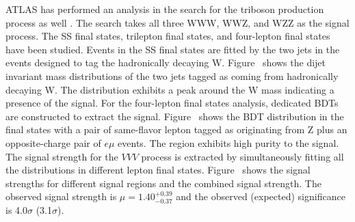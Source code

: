 ATLAS has performed an analysis in the search for the triboson production process as well \cite{Aad:2019udh}.
The search takes all three WWW, WWZ, and WZZ as the signal process.
The SS final states, trilepton final states, and four-lepton final states have been studied.
Events in the SS final states are fitted by the two jets in the events designed to tag the hadronically decaying W.
Figure~ shows the dijet invariant mass distributions of the two jets tagged as coming from hadronically decaying W.
The distribution exhibits a peak around the W mass indicating a presence of the signal.
For the four-lepton final states analysis, dedicated BDTs are constructed to extract the signal.
Figure~ shows the BDT distribution in the final states with a pair of same-flavor lepton tagged as originating from Z plus an opposite-charge pair of $e\mu$ events.
The region exhibits high purity to the signal.
The signal strength for the $VVV$ process is extracted by simultaneously fitting all the distributions in different lepton final states.
Figure~ shows the signal strengths for different signal regions and the combined signal strength.
The observed signal strength is $\mu = 1.40^{+0.39}_{-0.37}$ and the observed (expected) significance is 4.0$\sigma$ (3.1$\sigma$).

\begin{figure}[htb]
\centering
\caption{}
\label{fig:ATLASVVV}
\end{figure}

